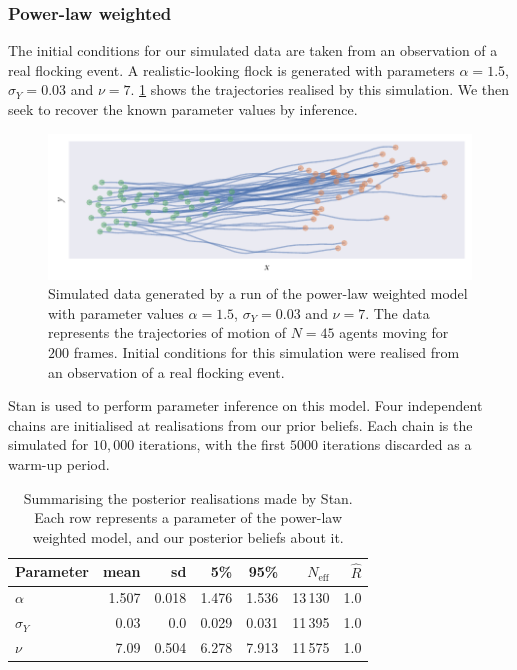 \subsubsection{Power-law weighted}

The initial conditions for our simulated data are taken from an observation of a real
flocking event. A realistic-looking flock is generated with parameters $\alpha=1.5$,
$\sigma_Y=0.03$ and $\nu=7$.  \cref{fig:power_sim_study} shows the trajectories realised
by this simulation. We then seek to recover the known parameter values by inference.

\begin{figure}[tb]
    \includegraphics{power_sim.pdf}
    \caption{Simulated data generated by a run of the power-law weighted model with
    parameter values $\alpha=1.5$, $\sigma_Y=0.03$ and $\nu=7$. The data represents the
    trajectories of motion of $N=45$ agents moving for $200$ frames. Initial conditions
    for this simulation were realised from an observation of a real flocking event.}
    \label{fig:power_sim_study}
\end{figure}

Stan is used to perform parameter inference on this model. Four independent chains are
initialised at realisations from our prior beliefs. Each chain is the simulated for
$10,000$ iterations, with the first $5000$ iterations discarded as a warm-up period.

\begin{table}[tb]
\begin{tabular}{@{}lrrrrrr@{}}
\toprule
Parameter &  mean &    sd & 5\% & 95\% & $N_{\textrm{eff}}$ & $\hat{R}$ \\
\midrule
$\alpha$ & 1.507 & 0.018 &   1.476 &    1.536 &            13\,130 &       1.0 \\
$\sigma_{Y}$ & 0.03 & 0.0 &   0.029 &    0.031 &            11\,395 &       1.0 \\
$\nu$ & 7.09 & 0.504 &   6.278 &    7.913 &            11\,575 &       1.0 \\
\bottomrule
\end{tabular}
\caption{Summarising the posterior realisations made by Stan. Each row represents a
parameter of the power-law weighted model, and our posterior beliefs about it.}
\label{tab:power_sim_study_summary}
\end{table}

